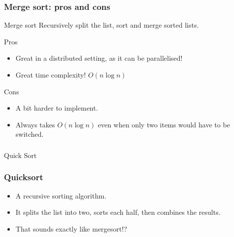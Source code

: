 \begin{frame}
	\frametitle{Merge sort: pros and cons}
	\begin{block}{Merge sort}
			Recursively split the list, sort and merge sorted lists.
		\end{block}	
		\begin{block}{Pros}
			\begin{itemize}
				\item Great in a distributed setting, as it can be parallelised!
				\item Great time complexity! $O(n\log n)$
			\end{itemize}
		\end{block}	
		\begin{block}{Cons}
			\begin{itemize}
				\item A bit harder to implement.
				\item Always takes $O(n \log n)$ even when only two items would have to be switched.
			\end{itemize}
		\end{block}	
\end{frame}

\begin{frame}[fragile]\frametitle{}
\begin{center}
{\Large Quick Sort}
\end{center}

\end{frame}

\begin{frame}
	\frametitle{Quicksort}
			\begin{itemize}
				\item A recursive sorting algorithm.
				\item It splits the list into two, sorts each half, then combines the results.
				\item That sounds exactly like mergesort!?
	\end{itemize}	
\end{frame}


